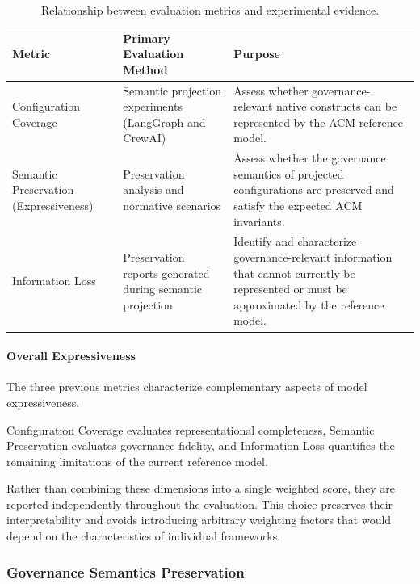 \documentclass[10pt]{article}
\begin{document}
\begin{table}[t]
	\centering
	\caption{Relationship between evaluation metrics and experimental evidence.}
	\label{tab:evaluation_metrics}
	\renewcommand{\arraystretch}{1.2}
	\begin{tabularx}{\linewidth}{lXX}
		\toprule
		\textbf{Metric} &
		\textbf{Primary Evaluation Method} &
		\textbf{Purpose} \\
		\midrule
		
		Configuration Coverage &
		Semantic projection experiments (LangGraph and CrewAI) &
		Assess whether governance-relevant native constructs can be represented by the ACM reference model. \\
		
		Semantic Preservation (Expressiveness) &
		Preservation analysis and normative scenarios &
		Assess whether the governance semantics of projected configurations are preserved and satisfy the expected ACM invariants. \\
		
		Information Loss &
		Preservation reports generated during semantic projection &
		Identify and characterize governance-relevant information that cannot currently be represented or must be approximated by the reference model. \\
		
		\bottomrule
	\end{tabularx}
\end{table}

\paragraph{Overall Expressiveness}

The three previous metrics characterize complementary aspects of model
expressiveness.

Configuration Coverage evaluates representational completeness, Semantic
Preservation evaluates governance fidelity, and Information Loss quantifies the
remaining limitations of the current reference model.

Rather than combining these dimensions into a single weighted score, they are
reported independently throughout the evaluation. This choice preserves their
interpretability and avoids introducing arbitrary weighting factors that would
depend on the characteristics of individual frameworks.


\subsubsection{Governance Semantics Preservation}
\end{document}
